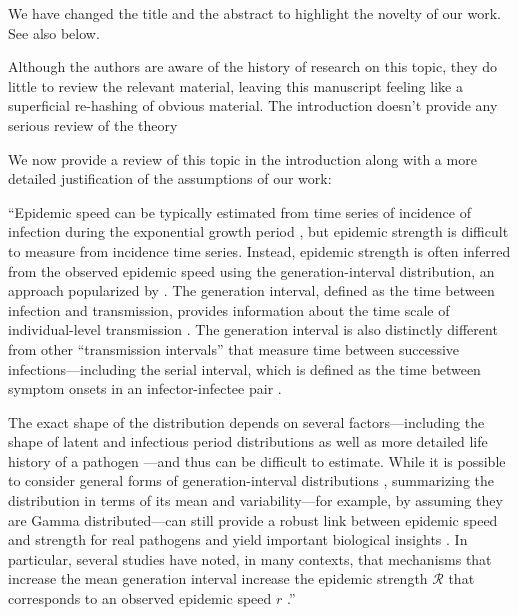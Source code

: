 \documentclass[12pt]{article}
\newcommand{\RR}{\ensuremath{{\mathcal R}}\xspace}
\newcommand{\revtext}{\textsf}
\begin{document}
We have changed the title and the abstract to highlight the novelty of our work. 
See also below.

\revtext{Although the authors are aware of the history of research on this topic, they do little to review the relevant material, leaving this manuscript feeling like a superficial re-hashing of obvious material.  The introduction doesn't provide any serious review of the theory}

We now provide a review of this topic in the introduction along with a more detailed justification of the assumptions of our work:

``Epidemic speed can be typically estimated from time series of incidence of infection during the exponential growth period \citep{mills2004transmissibility,nishiura2009transmission,ma2014estimating}, but epidemic strength is difficult to measure from incidence time series.
Instead, epidemic strength is often inferred from the observed epidemic speed using the generation-interval distribution, an approach popularized by \citep{wallinga2007generation}.
The generation interval, defined as the time between infection and transmission, provides information about the time scale of individual-level transmission \citep{svensson2007note}.
The generation interval is also distinctly different from other ``transmission intervals'' that measure time between successive infections---including the serial interval, which is defined as the time between symptom onsets in an infector-infectee pair \citep{fine2003interval,grassly2008mathematical,britton2019estimation,ali2020serial,park2021forward}.

The exact shape of the distribution depends on several factors---including the shape of latent and infectious period distributions \citep{lloyd2001realistic,wearing2005appropriate,roberts2007model} as well as more detailed life history of a pathogen \citep{huber2016quantitative}---and thus can be difficult to estimate.
While it is possible to consider general forms of generation-interval distributions \citep{miller2010epidemics,svensson2015influence}, summarizing the distribution in terms of its mean and variability---for example, by assuming they are Gamma distributed---can still provide a robust link between epidemic speed and strength for real pathogens and yield important biological insights \citep{park2019practical}.
In particular, several studies have noted, in many contexts, that mechanisms that increase the mean generation interval increase the epidemic strength $\RR$ that corresponds to an observed epidemic speed $r$ \citep{eaton2014proportion,powers2014impact,weitz2015modeling,park2020time}.''
\end{document}
